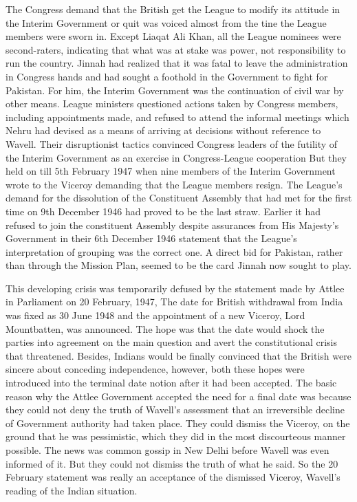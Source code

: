 \begin{multicols}{2}
The Congress demand that the British get the League to modify its attitude in the Interim Government or quit was voiced almost from the tine the League members were sworn in. Except Liaqat Ali Khan, all the League nominees were second-raters, indicating that what was at stake was power, not responsibility to run the country. Jinnah had realized that it was fatal to leave the administration in Congress hands and had sought a foothold in the Government to fight for Pakistan. For him, the Interim Government was the continuation of civil war by other means. League ministers questioned actions taken by Congress members, including appointments made, and refused to attend the informal meetings which Nehru had devised as a means of arriving at decisions without reference to Wavell. Their disruptionist tactics convinced Congress leaders of the futility of the Interim Government as an exercise in Congress-League cooperation But they held on till 5th February 1947 when nine members of the Interim Government wrote to the Viceroy demanding that the League members resign. The League's demand for the dissolution of the Constituent Assembly that had met for the first time on 9th December 1946 had proved to be the last straw. Earlier it had refused to join the constituent Assembly despite assurances from His Majesty's Government in their 6th December 1946 statement that the League's interpretation of grouping was the correct one. A direct bid for Pakistan, rather than through the Mission Plan, seemed to be the card Jinnah now sought to play. 

This developing crisis was temporarily defused by the statement made by Attlee in Parliament on 20 February, 1947, The date for British withdrawal from India was fixed as 30 June 1948 and the appointment of a new Viceroy, Lord Mountbatten, was announced. The hope was that the date would shock the parties into agreement on the main question and avert the constitutional crisis that threatened. Besides, Indians would be finally convinced that the British were sincere about conceding independence, however, both these hopes were introduced into the terminal date notion after it had been accepted. The basic reason why the Attlee Government accepted the need for a final date was because they could not deny the truth of Wavell's assessment that an irreversible decline of Government authority had taken place. They could dismiss the Viceroy, on the ground that he was pessimistic, which they did in the most discourteous manner possible. The news was common gossip in New Delhi before Wavell was even informed of it. But they could not dismiss the truth of what he said. So the 20 February statement was really an acceptance of the dismissed Viceroy, Wavell's reading of the Indian situation. 


\end{multicols}
